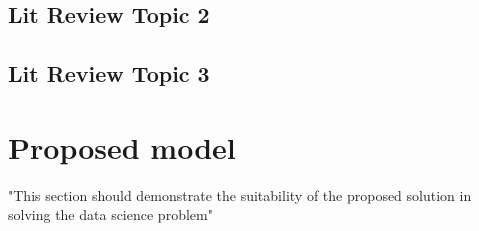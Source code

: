 \documentclass[12pt]{report}
\begin{document}
\section{Lit Review Topic 2}


\section{Lit Review Topic 3}



\chapter{Proposed model}
"This section should demonstrate the suitability of
the proposed solution in solving the data science problem"





\printbibliography
\end{document}
